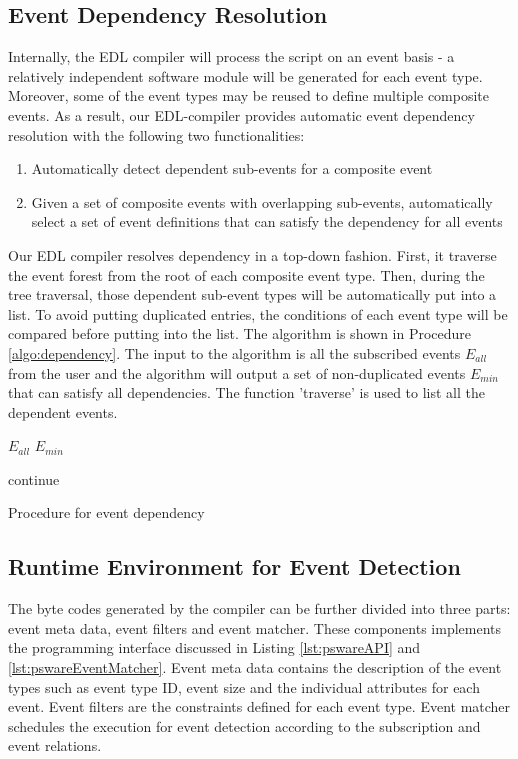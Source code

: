 \subsection{Event Dependency Resolution}
Internally, the EDL compiler will process the script on an event basis - a relatively independent software module will be generated for each event type. Moreover, some of the event types may be reused to define multiple composite events. As a result, our EDL-compiler provides automatic event dependency resolution with the following two functionalities:
\begin{enumerate}
\item Automatically detect dependent sub-events for a composite event
\item Given a set of composite events with overlapping sub-events, automatically select a set of event definitions that can satisfy the dependency for all events
\end{enumerate}
Our EDL compiler resolves dependency in a top-down fashion. First, it traverse the event forest from the root of each composite event type. Then, during the tree traversal, those dependent sub-event types will be automatically put into a list. To avoid putting duplicated entries, the conditions of each event type will be compared before putting into the list. The algorithm is shown in Procedure \ref{algo:dependency}. The input to the algorithm is all the subscribed events \(E_{all}\) from the user and the algorithm will output a set of non-duplicated events \(E_{min}\) that can satisfy all dependencies. The function 'traverse' is used to list all the dependent events.

\begin{algorithm}
\begin{algorithmic}
\REQUIRE \(E_{all}\)
\ENSURE \(E_{min}\)


\STATE continue
\ENDIF

\ENDIF
\ENDFOR

\ENDFOR
\end{algorithmic}
\caption{Procedure for event dependency}
\label{algo:dependency}
\end{algorithm}

\subsection{Runtime Environment for Event Detection}
The byte codes generated by the compiler can be further divided into three parts: event meta data, event filters and event matcher. These components implements the programming interface discussed in Listing \ref{lst:pswareAPI} and \ref{lst:pswareEventMatcher}. Event meta data contains the description of the event types such as event type ID, event size and the individual attributes for each event. Event filters are the constraints defined for each event type. Event matcher schedules the execution for event detection according to the subscription and event relations.

